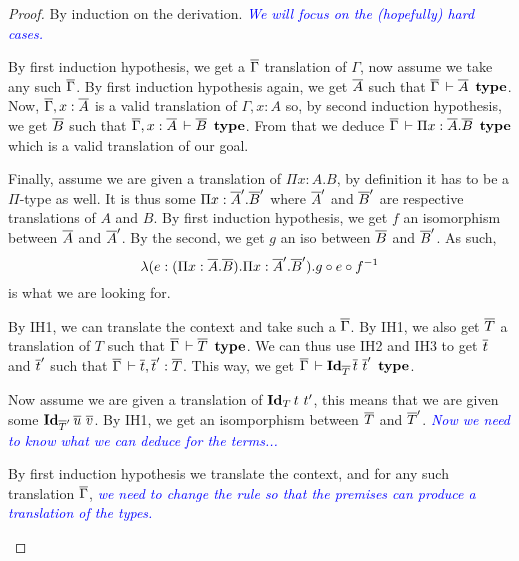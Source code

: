 \documentclass{amsart}
\newcommand\meta[1]{\noindent\textcolor{blue}{\emph{#1}}}
\begin{document}
\begin{proof}
  By induction on the derivation.
  \meta{We will focus on the (hopefully) hard cases.}
  \begin{caselist}
    \nextcase
    \begin{mathc}
    \end{mathc}
    By first induction hypothesis, we get a $\overline{\Gamma}$ translation of $\Gamma$,
    now assume we take any such $\overline{\Gamma}$.
    By first induction hypothesis again, we get $\overline{A}$ such that
    $\overline{\Gamma} \,\vdash \overline{A}\ \operatorname{\mathbf{type}}$.
    Now, $\overline{\Gamma}, x:\overline{A}$ is a valid translation of $\Gamma, x:A$ so,
    by second induction hypothesis, we get $\overline{B}$ such that
    $\overline{\Gamma}, x:\overline{A} \,\vdash \overline{B}\ \operatorname{\mathbf{type}}$.
    From that we deduce $\barG \der \Pi x:\barA.\barB\ \type$ which is a valid
    translation of our goal.

    Finally, assume we are given a translation of $\Pi x:A.B$, by definition
    it has to be a $\Pi$-type as well. It is thus some $\Pi x:\overline{A}'.\overline{B}'$
    where $\overline{A}'$ and $\overline{B}'$ are respective translations of $A$ and $B$.
    By first induction hypothesis, we get $f$ an isomorphism between $\overline{A}$
    and $\overline{A}'$. By the second, we get $g$ an iso between $\overline{B}$ and $\overline{B}'$.
    As such,
    \begin{equation*}
    \lambda (e:(\Pi x:\overline{A}.\overline{B}).\Pi x:\overline{A}'.\overline{B}'). g \circ e \circ f^{-1}
    \end{equation*}
    is what we are looking for.

    \nextcase
    \begin{mathc}
    \end{mathc}
    By IH1, we can translate the context and take such a $\overline{\Gamma}$.
    By IH1, we also get $\overline{T}$ a translation of $T$ such that
    $\overline{\Gamma} \,\vdash \overline{T}\ \operatorname{\mathbf{type}}$.
    We can thus use IH2 and IH3 to get $\overline{t}$ and $\overline{t}'$ such that
    $\overline{\Gamma} \,\vdash \overline{t}, \overline{t}' : \overline{T}$.
    This way, we get $\barG \der \Id{\barT}{\bart}{\bart'}\ \type$.

    Now assume we are given a translation of $\mathbf{Id}_{T}\,t\ t'$, this means that
    we are given some $\mathbf{Id}_{\overline{T}'}\,\overline{u}\ \overline{v}$.
    By IH1, we get an isomporphism between $\overline{T}$ and $\overline{T}'$.
    \meta{Now we need to know what we can deduce for the terms...}

    \nextcase
    \begin{mathc}
    \end{mathc}
    By first induction hypothesis we translate the context, and for any such
    translation $\overline{\Gamma}$, \meta{we need to change the rule so that the premises
    can produce a translation of the types.}


\end{caselist}
\end{proof}
\end{document}
